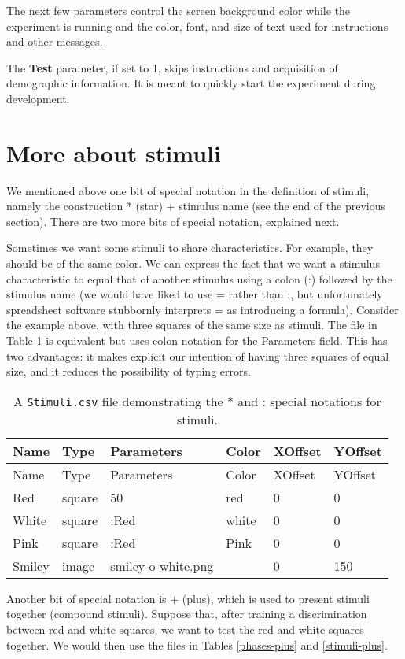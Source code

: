 \documentclass[11pt,]{article}
\begin{document}
The next few parameters control the screen background color while the
experiment is running and the color, font, and size of text used for
instructions and other messages.

The \textbf{Test} parameter, if set to 1, skips instructions and
acquisition of demographic information. It is meant to quickly start the
experiment during development.

\section{More about stimuli}\label{more-about-stimuli}

We mentioned above one bit of special notation in the definition of
stimuli, namely the construction * (star) + stimulus name (see the end
of the previous section). There are two more bits of special notation,
explained next.

Sometimes we want some stimuli to share characteristics. For example,
they should be of the same color. We can express the fact that we want a
stimulus characteristic to equal that of another stimulus using a colon
(:) followed by the stimulus name (we would have liked to use = rather
than :, but unfortunately spreadsheet software stubbornly interprets =
as introducing a formula). Consider the example above, with three
squares of the same size as stimuli. The file in Table
\ref{stimuli-special} is equivalent but uses colon notation for the
Parameters field. This has two advantages: it makes explicit our
intention of having three squares of equal size, and it reduces the
possibility of typing errors.

\begin{longtable}[c]{@{}llllll@{}}
\caption{A \texttt{Stimuli.csv} file demonstrating the * and : special
notations for stimuli. \label{stimuli-special}}\tabularnewline
\toprule
Name & Type & Parameters & Color & XOffset & YOffset\tabularnewline
\midrule
\endfirsthead
\toprule
Name & Type & Parameters & Color & XOffset & YOffset\tabularnewline
\midrule
\endhead
Red & square & 50 & red & 0 & 0\tabularnewline
White & square & :Red & white & 0 & 0\tabularnewline
Pink & square & :Red & Pink & 0 & 0\tabularnewline
Smiley & image & smiley-o-white.png & & 0 & 150\tabularnewline
\bottomrule
\end{longtable}

Another bit of special notation is + (plus), which is used to present
stimuli together (compound stimuli). Suppose that, after training a
discrimination between red and white squares, we want to test the red
and white squares together. We would then use the files in Tables
\ref{phases-plus} and \ref{stimuli-plus}.
\end{document}
